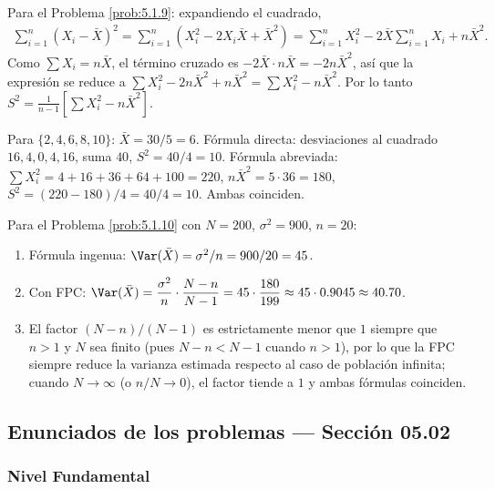 \begin{solucion}
	\label{sol:5.1.9}
	Para el Problema \ref{prob:5.1.9}: expandiendo el cuadrado,
	\begin{align*}
		\sum_{i=1}^n(X_i-\bar X)^2 = \sum_{i=1}^n\left(X_i^2 - 2X_i\bar X + \bar X^2\right)
		= \sum_{i=1}^n X_i^2 - 2\bar X\sum_{i=1}^n X_i + n\bar X^2.
	\end{align*}
	Como $\sum X_i = n\bar X$, el término cruzado es $-2\bar X\cdot n\bar X = -2n\bar X^2$, así que la expresión se reduce a $\sum X_i^2 - 2n\bar X^2 + n\bar X^2 = \sum X_i^2 - n\bar X^2$. Por lo tanto $S^2 = \frac{1}{n-1}\left[\sum X_i^2 - n\bar X^2\right]$.

	Para $\{2,4,6,8,10\}$: $\bar X = 30/5=6$. Fórmula directa: desviaciones al cuadrado $16,4,0,4,16$, suma $40$, $S^2=40/4=10$. Fórmula abreviada: $\sum X_i^2 = 4+16+36+64+100=220$, $n\bar X^2 = 5\cdot 36=180$, $S^2=(220-180)/4=40/4=10$. Ambas coinciden. \quad \qedhere
\end{solucion}

\begin{solucion}
	\label{sol:5.1.10}
	Para el Problema \ref{prob:5.1.10} con $N=200$, $\sigma^2=900$, $n=20$:
	\begin{enumerate}
		\item Fórmula ingenua: $\Var(\bar X) = \sigma^2/n = 900/20 = 45$.
		\item Con FPC: $\Var(\bar X) = \dfrac{\sigma^2}{n}\cdot\dfrac{N-n}{N-1} = 45\cdot\dfrac{180}{199} \approx 45\cdot 0.9045 \approx 40.70$.
		\item El factor $(N-n)/(N-1)$ es estrictamente menor que $1$ siempre que $n>1$ y $N$ sea finito (pues $N-n<N-1$ cuando $n>1$), por lo que la FPC siempre reduce la varianza estimada respecto al caso de población infinita; cuando $N\to\infty$ (o $n/N\to 0$), el factor tiende a $1$ y ambas fórmulas coinciden. \quad \qedhere
	\end{enumerate}
\end{solucion}


\subsection*{Enunciados de los problemas --- Sección 05.02}

\subsubsection*{Nivel Fundamental}

